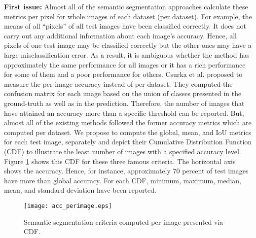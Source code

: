 \documentclass[journal,transmag]{IEEEtran}
\begin{document}
\textbf{First issue:} Almost all of the semantic segmentation approaches calculate these metrics per pixel for whole images of each dataset (per dataset). For example, the  means  of all “pixels” of all test images have been classified correctly.   It does not carry out any additional information about each image's accuracy. Hence, all pixels of one test image may be classified correctly but the other ones may have a large misclassification error. As a result, it is ambiguous whether the method has approximately the same performance for all images or it has a rich performance for some of them and a poor performance for others. Csurka et al. \cite{csurka2013good} proposed to measure the per image accuracy instead of per dataset. They computed the confusion matrix for each image based on the union of classes presented in the ground-truth as well as in the prediction. Therefore, the number of images that have attained an accuracy more than a specific threshold can be reported. But, almost all of the existing methods followed the former accuracy metrics which are computed per dataset. We propose to compute the global, mean, and IoU metrics for each test image, separately and depict their Cumulative Distribution Function (CDF) to illustrate the least number of images with a specified accuracy level. Figure \ref{fig:acc_per_image} shows this CDF for these three famous criteria. The horizontal axis shows the accuracy. Hence, for instance, approximately 70 percent of test images have more than  global accuracy. For each CDF, minimum, maximum, median, mean, and standard deviation have been reported.

\begin{figure}
	\begin{center}
		\texttt{[image: acc\_perimage.eps]}
	\end{center}
	\caption{Semantic segmentation criteria computed per image presented via CDF.}
	\label{fig:acc_per_image}
\end{figure}
\end{document}
